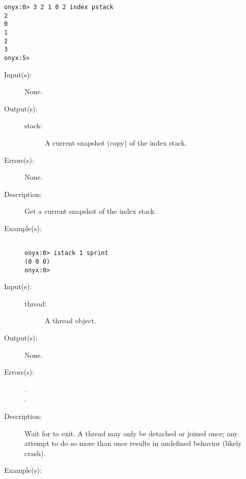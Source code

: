 \begin{description}
\begin{description}
\begin{verbatim}
onyx:0> 3 2 1 0 2 index pstack
2
0
1
2
3
onyx:5>
		\end{verbatim}
	\end{description}
\label{systemdict:istack}
\item[{\onyxop{--}{istack}{stack}}: ]
	\begin{description}\item[]
	\item[Input(s): ] None.
	\item[Output(s): ]
		\begin{description}\item[]
		\item[stack: ]
			A current snapshot (copy) of the index stack.
		\end{description}
	\item[Errors(s): ] None.
	\item[Description: ]
		Get a current snapshot of the index stack.
	\item[Example(s): ]\begin{verbatim}

onyx:0> istack 1 sprint
(0 0 0)
onyx:0>
		\end{verbatim}
	\end{description}
\label{systemdict:join}
\item[{\onyxop{thread}{join}{--}}: ]
	\begin{description}\item[]
	\item[Input(s): ]
		\begin{description}\item[]
		\item[thread: ]
			A thread object.
		\end{description}
	\item[Output(s): ] None.
	\item[Errors(s): ]
		\begin{description}\item[]
		\item[.]
		\item[.]
		\end{description}
	\item[Description: ]
		Wait for  to exit.  A thread may only be detached
		or joined once; any attempt to do so more than once results in
		undefined behavior (likely crash).
	\item[Example(s): ]\begin{verbatim}


\end{verbatim}
\end{description}
\end{description}
